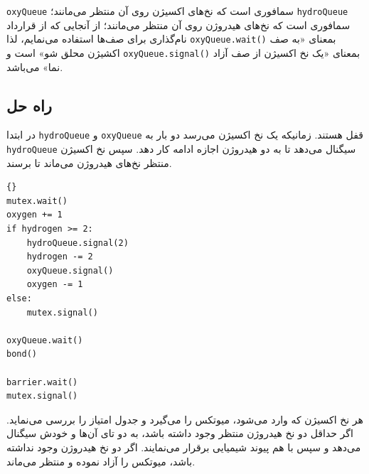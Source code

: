 \documentclass{book}
\newcommand{\clearemptydoublepage}{\newpage\cleardoublepage}
\begin{document}
    {\tt oxyQueue} سمافوری است که نخ‌های اکسیژن روی آن منتظر می‌مانند؛ 
    {\tt hydroQueue} سمافوری است که نخ‌های هیدروژن روی آن منتظر می‌مانند؛ 
    از آنجایی که از قرارداد نام‌گذاری برای صف‌ها استفاده می‌نمایم، لذا {\tt oxyQueue.wait()} بمعنای «به صف اکشیژن محلق شو» است 
    و {\tt oxyQueue.signal()} بمعنای «یک نخ اکسیژن از صف آزاد نما» می‌باشد. 


\clearemptydoublepage
\subsection {راه حل  }

    در ابتدا {\tt hydroQueue} و {\tt oxyQueue} قفل هستند. زمانیکه یک نخ اکسیژن می‌رسد دو بار به {\tt hydroQueue}  سیگنال می‌دهد تا 
    به دو هیدروژن اجازه ادامه کار دهد. سپس نخ اکسیژن منتظر نخ‌های هیدروژن می‌ماند تا برسند. 

\begin{latin}
\begin{lstlisting}[title=\rl{ کد اکسیژن}]{}
mutex.wait()
oxygen += 1
if hydrogen >= 2:
    hydroQueue.signal(2)
    hydrogen -= 2
    oxyQueue.signal()
    oxygen -= 1
else:
    mutex.signal()

oxyQueue.wait()
bond()

barrier.wait()
mutex.signal()
\end{lstlisting}
\end{latin}

    هر نخ اکسیژن که وارد می‌شود، میوتکس را می‌گیرد و جدول امتیاز را بررسی می‌نماید. اگر حداقل دو نخ هیدروژن منتظر وجود داشته باشد، به دو تای آن‌ها و خودش 
    سیگنال می‌دهد و سپس با هم پیوند شیمیایی برقرار می‌نمایند. اگر دو نخ هیدروژن وجود نداشته باشد، میوتکس را آزاد نموده و منتظر می‌ماند. 
\end{document}
